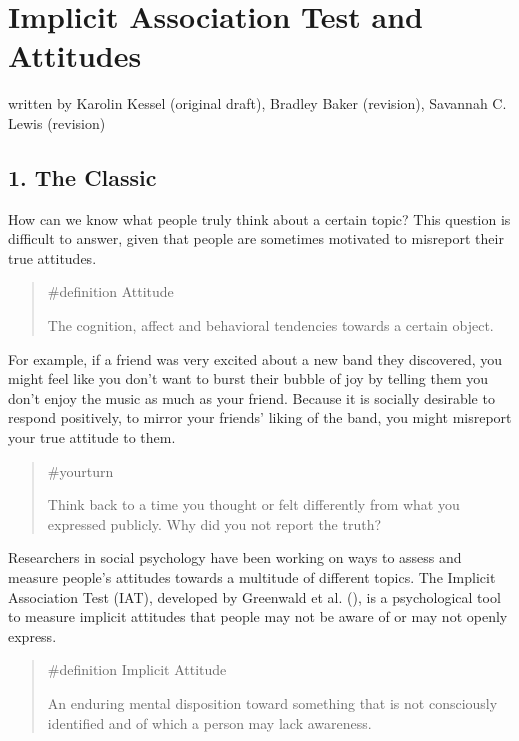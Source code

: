 \documentclass[
  letterpaper,
]{book}
\begin{document}

\chapter{\texorpdfstring{{Implicit Association Test and
Attitudes}}{Implicit Association Test and Attitudes}}\label{implicit-association-test-and-attitudes}

{written by Karolin Kessel (original draft), Bradley Baker (revision),
Savannah C. Lewis (revision)}

\section{1. The Classic}\label{the-classic-2}

How can we know what people truly think about a certain topic? This
question is difficult to answer, given that people are sometimes
motivated to misreport their true attitudes.

\begin{quote}
\label{def-attitude}{\#definition} Attitude

The cognition, affect and behavioral tendencies towards a certain
object.
\end{quote}

For example, if a friend was very excited about a new band they
discovered, you might feel like you don't want to burst their bubble of
joy by telling them you don't enjoy the music as much as your friend.
Because it is socially desirable to respond positively, to mirror your
friends' liking of the band, you might misreport your true attitude to
them.

\begin{quote}
{\#yourturn}

Think back to a time you thought or felt differently from what you
expressed publicly. Why did you not report the truth?
\end{quote}

Researchers in social psychology have been working on ways to assess and
measure people's attitudes towards a multitude of different topics. The
Implicit Association Test (IAT), developed by Greenwald et al.
(), is a psychological tool to
measure implicit attitudes that people may not be aware of or may not
openly express.

\begin{quote}
\label{def-implicitattitude}{\#definition} Implicit
Attitude

An enduring mental disposition toward something that is not consciously
identified and of which a person may lack awareness.
\end{quote}
\end{document}
